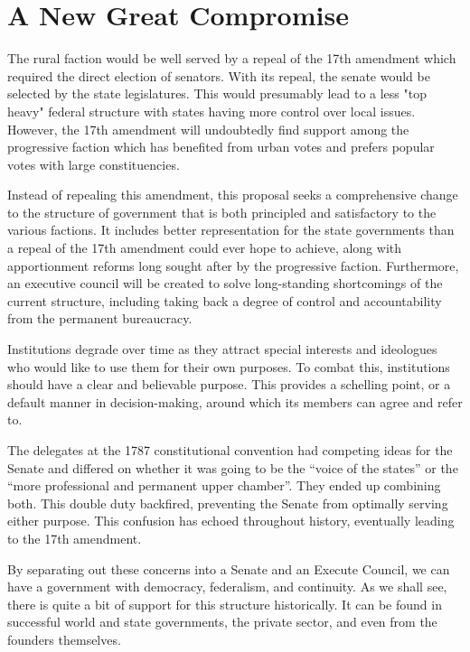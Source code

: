 \documentclass{article}
\begin{document}
\section{A New Great Compromise}

The rural faction would be well served by a repeal of the 17th amendment\cite{Tucker}\cite{Virginia} which required the direct election of senators. With its repeal, the senate would be selected by the state legislatures. This would presumably lead to a less "top heavy" federal structure with states having more control over local issues. However, the 17th amendment will undoubtedly find support among the progressive faction which has benefited from urban votes and prefers popular votes with large constituencies\cite{Smith}.

Instead of repealing this amendment, this proposal seeks a comprehensive change to the structure of government that is both principled and satisfactory to the various factions. It includes better representation for the state governments than a repeal of the 17th amendment could ever hope to achieve, along with apportionment reforms long sought after by the progressive faction. Furthermore, an executive council will be created to solve long-standing shortcomings of the current structure, including taking back a degree of control and accountability from the permanent bureaucracy.

Institutions degrade over time as they attract special interests and ideologues who would like to use them for their own purposes. To combat this, institutions should have a clear and believable purpose. This provides a schelling point, or a default manner in decision-making, around which its members can agree and refer to\cite{Komoroske}. 

The delegates at the 1787 constitutional convention had competing ideas for the Senate and differed on whether it was going to be the “voice of the states” or the “more professional and permanent upper chamber”. They ended up combining both. This double duty backfired, preventing the Senate from optimally serving either purpose. This confusion has echoed throughout history, eventually leading to the 17th amendment.

By separating out these concerns into a Senate and an Execute Council, we can have a government with democracy, federalism, and continuity. As we shall see, there is quite a bit of support for this structure historically. It can be found in successful world and state governments, the private sector, and even from the founders themselves.
\end{document}
